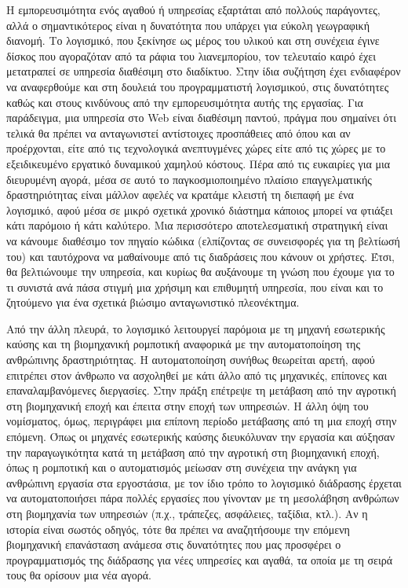 \documentclass[
]{article}
\begin{document}
Η εμπορευσιμότητα ενός αγαθού ή υπηρεσίας εξαρτάται από πολλούς
παράγοντες, αλλά ο σημαντικότερος είναι η δυνατότητα που υπάρχει για
εύκολη γεωγραφική διανομή. Το λογισμικό, που ξεκίνησε ως μέρος του
υλικού και στη συνέχεια έγινε δίσκος που αγοραζόταν από τα ράφια του
λιανεμπορίου, τον τελευταίο καιρό έχει μετατραπεί σε υπηρεσία διαθέσιμη
στο διαδίκτυο. Στην ίδια συζήτηση έχει ενδιαφέρον να αναφερθούμε και στη
δουλειά του προγραμματιστή λογισμικού, στις δυνατότητες καθώς και στους
κινδύνους από την εμπορευσιμότητα αυτής της εργασίας. Για παράδειγμα,
μια υπηρεσία στο Web είναι διαθέσιμη παντού, πράγμα που σημαίνει ότι
τελικά θα πρέπει να ανταγωνιστεί αντίστοιχες προσπάθειες από όπου και αν
προέρχονται, είτε από τις τεχνολογικά ανεπτυγμένες χώρες είτε από τις
χώρες με το εξειδικευμένο εργατικό δυναμικού χαμηλού κόστους. Πέρα από
τις ευκαιρίες για μια διευρυμένη αγορά, μέσα σε αυτό το
παγκοσμιοποιημένο πλαίσιο επαγγελματικής δραστηριότητας είναι μάλλον
αφελές να κρατάμε κλειστή τη διεπαφή με ένα λογισμικό, αφού μέσα σε
μικρό σχετικά χρονικό διάστημα κάποιος μπορεί να φτιάξει κάτι παρόμοιο ή
κάτι καλύτερο. Μια περισσότερο αποτελεσματική στρατηγική είναι να
κάνουμε διαθέσιμο τον πηγαίο κώδικα (ελπίζοντας σε συνεισφορές για τη
βελτίωσή του) και ταυτόχρονα να μαθαίνουμε από τις διαδράσεις που κάνουν
οι χρήστες. Έτσι, θα βελτιώνουμε την υπηρεσία, και κυρίως θα αυξάνουμε
τη γνώση που έχουμε για το τι συνιστά ανά πάσα στιγμή μια χρήσιμη και
επιθυμητή υπηρεσία, που είναι και το ζητούμενο για ένα σχετικά βιώσιμο
ανταγωνιστικό πλεονέκτημα.

Από την άλλη πλευρά, το λογισμικό λειτουργεί παρόμοια με τη μηχανή
εσωτερικής καύσης και τη βιομηχανική ρομποτική αναφορικά με την
αυτοματοποίηση της ανθρώπινης δραστηριότητας. Η αυτοματοποίηση συνήθως
θεωρείται αρετή, αφού επιτρέπει στον άνθρωπο να ασχοληθεί με κάτι άλλο
από τις μηχανικές, επίπονες και επαναλαμβανόμενες διεργασίες. Στην πράξη
επέτρεψε τη μετάβαση από την αγροτική στη βιομηχανική εποχή και έπειτα
στην εποχή των υπηρεσιών. Η άλλη όψη του νομίσματος, όμως, περιγράφει
μια επίπονη περίοδο μετάβασης από τη μια εποχή στην επόμενη. Όπως οι
μηχανές εσωτερικής καύσης διευκόλυναν την εργασία και αύξησαν την
παραγωγικότητα κατά τη μετάβαση από την αγροτική στη βιομηχανική εποχή,
όπως η ρομποτική και ο αυτοματισμός μείωσαν στη συνέχεια την ανάγκη για
ανθρώπινη εργασία στα εργοστάσια, με τον ίδιο τρόπο το λογισμικό
διάδρασης έρχεται να αυτοματοποιήσει πάρα πολλές εργασίες που γίνονταν
με τη μεσολάβηση ανθρώπων στη βιομηχανία των υπηρεσιών (π.χ., τράπεζες,
ασφάλειες, ταξίδια, κτλ.). Αν η ιστορία είναι σωστός οδηγός, τότε θα
πρέπει να αναζητήσουμε την επόμενη βιομηχανική επανάσταση ανάμεσα στις
δυνατότητες που μας προσφέρει ο προγραμματισμός της διάδρασης για νέες
υπηρεσίες και αγαθά, τα οποία με τη σειρά τους θα ορίσουν μια νέα αγορά.
\end{document}
